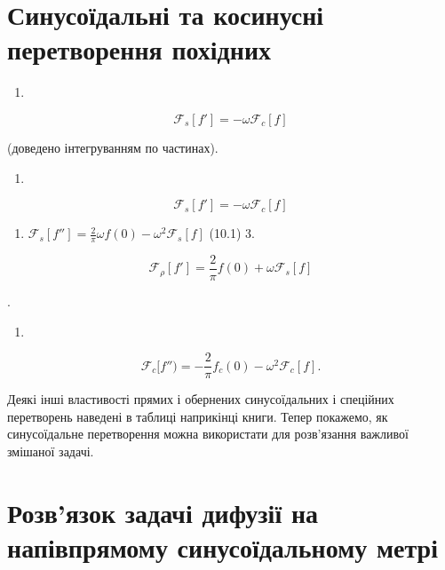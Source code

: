\documentclass[
  ukrainian,
]{article}
\providecommand{\tightlist}{%
  \setlength{\itemsep}{0pt}\setlength{\parskip}{0pt}}
\begin{document}
\section{Синусоїдальні та косинусні перетворення
похідних}\label{ux441ux438ux43dux443ux441ux43eux457ux434ux430ux43bux44cux43dux456-ux442ux430-ux43aux43eux441ux438ux43dux443ux441ux43dux456-ux43fux435ux440ux435ux442ux432ux43eux440ux435ux43dux43dux44f-ux43fux43eux445ux456ux434ux43dux438ux445}

\begin{enumerate}
\def\labelenumi{\arabic{enumi}.}
\tightlist
\item
\end{enumerate}

\[
\mathcal{F}_s[f'] = -\omega \mathcal{F}_c[f]
\]

(доведено інтегруванням по частинах).

\begin{enumerate}
\def\labelenumi{\arabic{enumi}.}
\tightlist
\item
\end{enumerate}

\[
\mathcal{F}_s[f'] = -\omega \mathcal{F}_c[f]
\]

\begin{enumerate}
\def\labelenumi{\arabic{enumi}.}
\setcounter{enumi}{1}
\tightlist
\item
  \(\mathcal{F}_s[f''] = \frac{2}{\pi} \omega f(0) - \omega^2 \mathcal{F}_s[f]\)
  (10.1) 3.
\end{enumerate}

\[
\mathcal{F}_{\rho}[f'] = \frac{2}{\pi} f(0) + \omega \mathcal{F}_{s}[f]
\]

.

\begin{enumerate}
\def\labelenumi{\arabic{enumi}.}
\setcounter{enumi}{3}
\tightlist
\item
\end{enumerate}

\[
\mathcal{F}_{c}[f'') = -\frac{2}{\pi} f_{c}(0) - \omega^{2} \mathcal{F}_{c}[f].
\]

Деякі інші властивості прямих і обернених синусоїдальних і спеційних
перетворень наведені в таблиці наприкінці книги. Тепер покажемо, як
синусоїдальне перетворення можна використати для розв'язання важливої
змішаної задачі.

\section{Розв'язок задачі дифузії на напівпрямому синусоїдальному
метрі}\label{ux440ux43eux437ux432ux44fux437ux43eux43a-ux437ux430ux434ux430ux447ux456-ux434ux438ux444ux443ux437ux456ux457-ux43dux430-ux43dux430ux43fux456ux432ux43fux440ux44fux43cux43eux43cux443-ux441ux438ux43dux443ux441ux43eux457ux434ux430ux43bux44cux43dux43eux43cux443-ux43cux435ux442ux440ux456}
\end{document}
